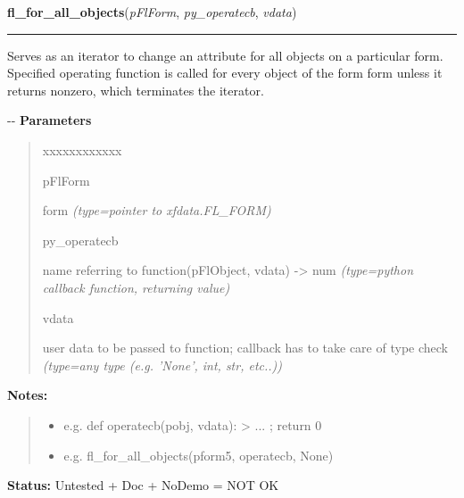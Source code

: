     \label{xformslib:flbasic:fl_for_all_objects}

    \vspace{0.5ex}

\hspace{.8\funcindent}\begin{boxedminipage}{\funcwidth}

    \raggedright \textbf{fl\_for\_all\_objects}(\textit{pFlForm}, \textit{py\_operatecb}, \textit{vdata})

    \vspace{-1.5ex}

    \rule{\textwidth}{0.5\fboxrule}
\setlength{\parskip}{2ex}

Serves as an iterator to change an attribute for all objects on a
particular form. Specified operating function is called for every object
of the form form unless it returns nonzero, which terminates the iterator.

-{}-
\setlength{\parskip}{1ex}
      \textbf{Parameters}
      \vspace{-1ex}

      \begin{quote}
        \begin{Ventry}{xxxxxxxxxxxx}

          \item[pFlForm]


form
            {\it (type=pointer to xfdata.FL\_FORM)}

          \item[py\_operatecb]


name referring to function(pFlObject, vdata) -> num
            {\it (type=python callback function, returning value)}

          \item[vdata]


user data to be passed to function; callback has to take care of
type check
            {\it (type=any type (e.g. 'None', int, str, etc..))}

        \end{Ventry}

      \end{quote}

\textbf{Notes:}
\begin{quote}
  \begin{itemize}

  \item
    \setlength{\parskip}{0.6ex}

e.g. def operatecb(pobj, vdata): > ... ; return 0


  \item 
e.g. fl\_for\_all\_objects(pform5, operatecb, None)


\end{itemize}

\end{quote}

\textbf{Status:} 
Untested + Doc + NoDemo = NOT OK


    \end{boxedminipage}

